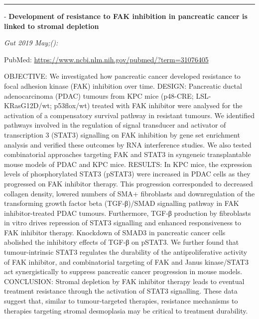 \documentclass[]{article}
\begin{document}
{}

{}

\begin{center}\rule{0.5\linewidth}{\linethickness}\end{center}

 - \textbf{Development of resistance to FAK inhibition in pancreatic
cancer is linked to stromal depletion}

\emph{Gut 2019 May;():}

PubMed: \url{https://www.ncbi.nlm.nih.gov/pubmed/?term=31076405}

OBJECTIVE: We investigated how pancreatic cancer developed resistance to
focal adhesion kinase (FAK) inhibition over time. DESIGN: Pancreatic
ductal adenocarcinoma (PDAC) tumours from KPC mice (p48-CRE;
LSL-KRasG12D/wt; p53flox/wt) treated with FAK inhibitor were analysed
for the activation of a compensatory survival pathway in resistant
tumours. We identified pathways involved in the regulation of signal
transducer and activator of transcription 3 (STAT3) signalling on FAK
inhibition by gene set enrichment analysis and verified these outcomes
by RNA interference studies. We also tested combinatorial approaches
targeting FAK and STAT3 in syngeneic transplantable mouse models of PDAC
and KPC mice. RESULTS: In KPC mice, the expression levels of
phosphorylated STAT3 (pSTAT3) were increased in PDAC cells as they
progressed on FAK inhibitor therapy. This progression corresponded to
decreased collagen density, lowered numbers of SMA+ fibroblasts and
downregulation of the transforming growth factor beta (TGF-β)/SMAD
signalling pathway in FAK inhibitor-treated PDAC tumours. Furthermore,
TGF-β production by fibroblasts in vitro drives repression of STAT3
signalling and enhanced responsiveness to FAK inhibitor therapy.
Knockdown of SMAD3 in pancreatic cancer cells abolished the inhibitory
effects of TGF-β on pSTAT3. We further found that tumour-intrinsic STAT3
regulates the durability of the antiproliferative activity of FAK
inhibitor, and combinatorial targeting of FAK and Janus kinase/STAT3 act
synergistically to suppress pancreatic cancer progression in mouse
models. CONCLUSION: Stromal depletion by FAK inhibitor therapy leads to
eventual treatment resistance through the activation of STAT3
signalling. These data suggest that, similar to tumour-targeted
therapies, resistance mechanisms to therapies targeting stromal
desmoplasia may be critical to treatment durability.

{}

{}
\end{document}
